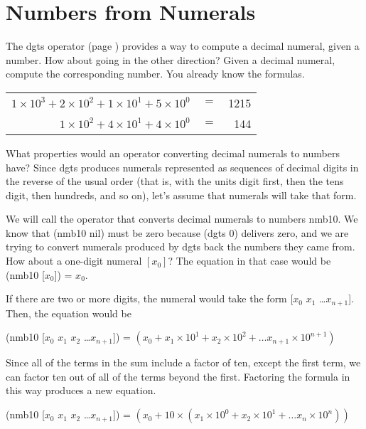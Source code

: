 \section{Numbers from Numerals}
\label{sec:numbers-from-numerals}
The dgts operator (page \pageref{dgts-defun})
provides a way to compute a decimal
numeral, given a number. How about going in the other direction?
Given a decimal numeral, compute the corresponding number.
You already know the formulas.
\begin{samepage}
\begin{center}
\begin{tabular}{rrr}
$1 \times 10^3 + 2 \times 10^2 + 1 \times 10^1 + 5 \times 10^0$ &$=$ & 1215 \\
$1 \times 10^2 + 4 \times 10^1 + 4 \times 10^0$                 &$=$ &  144 \\
\end{tabular}
\end{center}
\end{samepage}

What properties would an operator
converting decimal numerals to numbers have?
Since dgts produces numerals represented as sequences
of decimal digits in the reverse of the usual order
(that is, with the units digit first,
then the tens digit, then hundreds, and so on),
let's assume that numerals will take that form.

We will call the operator that converts decimal numerals to numbers nmb10.
We know that (nmb10 nil) must be zero because (dgts 0) delivers
zero, and we are trying to convert numerals produced by dgts
back the numbers they came from.
How about a one-digit numeral $[x_0]$?
The equation in that case would be (nmb10 [$x_0$]) = $x_0$.

If there are two or more digits, the numeral would take the form
[$x_0$ $x_1$ \dots $x_{n+1}$].
Then, the equation would be
\begin{center}
(nmb10 [$x_0$ $x_1$ $x_2$ \dots $x_{n+1}$]) =
$(x_0 + x_1 \times 10^1 + x_2 \times 10^2 + \dots x_{n+1} \times 10^{n+1})$
\end{center}

Since all of the terms in the sum
include a factor of ten, except the first term,
we can factor ten out of all of the terms beyond the first.
Factoring the formula in this way produces a new equation.
\begin{center}
(nmb10 [$x_0$ $x_1$ $x_2$ \dots $x_{n+1}$]) = $(x_0 + 10 \times (x_1 \times 10^0 + x_2 \times 10^1 + \dots x_n \times 10^n))$
\end{center}

